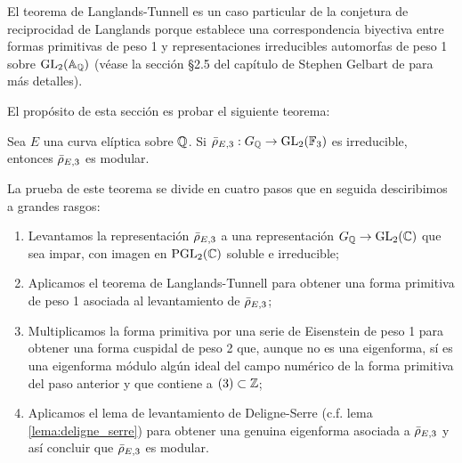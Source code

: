 \documentclass[../../tesis_maestria]{subfiles}
\begin{document}
El teorema de Langlands-Tunnell es un caso particular de la conjetura de reciprocidad de Langlands porque establece una correspondencia biyectiva entre formas primitivas de peso 1 y representaciones irreducibles automorfas de peso 1 sobre $\mathrm{GL}_2(\mathbb{A}_{\mathbb{Q}})$ (v\'ease la secci\'on \S2.5  del cap\'itulo de Stephen Gelbart de \cite{GelbartTL} para m\'as detalles).

El prop\'osito de esta secci\'on es probar el siguiente teorema:

\begin{thm}\label{thm:modularidad_rhot}
  Sea $E$ una curva el\'iptica sobre $\mathbb{Q}$. Si $\bar{\rho}_{E,3}:G_{\mathbb{Q}}\rightarrow \mathrm{GL}_2(\mathbb{F}_3)$ es irreducible, entonces $\bar{\rho}_{E,3}$ es modular.
\end{thm}

La prueba de este teorema se divide en cuatro pasos que en seguida desciribimos a grandes rasgos:
\begin{enumerate}
\item Levantamos la representaci\'on $\bar{\rho}_{E,3}$ a una representaci\'on $G_{\mathbb{Q}}\rightarrow\mathrm{GL}_2(\mathbb{C})$ que sea impar, con imagen en $\mathrm{PGL}_2(\mathbb{C})$ soluble e irreducible;
\item Aplicamos el teorema de Langlands-Tunnell para obtener una forma primitiva de peso 1 asociada al levantamiento de $\bar{\rho}_{E,3}$;
\item Multiplicamos la forma primitiva por una serie de Eisenstein de peso 1 para obtener una forma cuspidal de peso 2 que, aunque no es una eigenforma, s\'i es una eigenforma m\'odulo alg\'un ideal del campo num\'erico de la forma primitiva del paso anterior y que contiene a $(3)\subset\mathbb{Z}$;  
\item Aplicamos el lema de levantamiento de Deligne-Serre (c.f. lema \ref{lema:deligne_serre}) para obtener una genuina eigenforma asociada a $\bar{\rho}_{E,3}$ y as\'i concluir que $\bar{\rho}_{E,3}$ es modular.
\end{enumerate}
\end{document}
